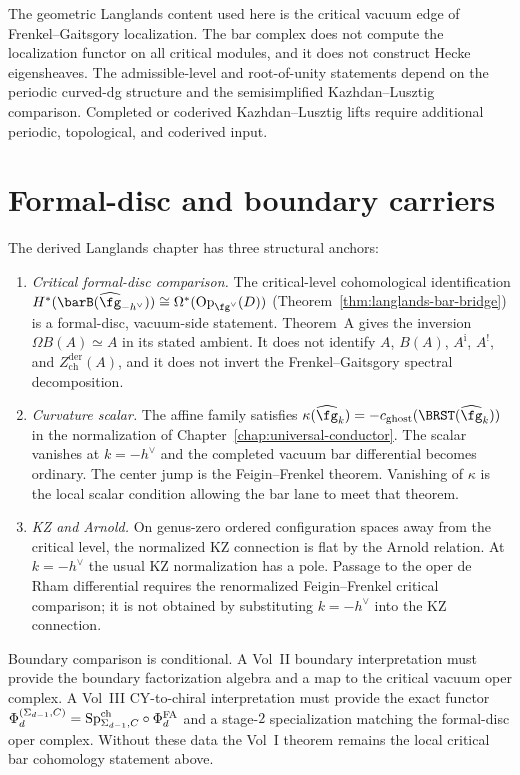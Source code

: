 The geometric Langlands content used here is the critical vacuum edge
of Frenkel--Gaitsgory localization. The bar complex does not compute
the localization functor on all critical modules, and it does not
construct Hecke eigensheaves. The admissible-level and root-of-unity
statements depend on the periodic curved-dg structure and the
semisimplified Kazhdan--Lusztig comparison. Completed or coderived
Kazhdan--Lusztig lifts require additional periodic, topological, and
coderived input.

\section{Formal-disc and boundary carriers}
\label{sec:dl-anchors}

\begin{remark}
\label{rem:dl-anchors}
The derived Langlands chapter has three structural anchors:
\begin{enumerate}[label=\textup{(\Roman*)}]
\item \emph{Critical formal-disc comparison.} The
 critical-level cohomological identification
 $H^*(\barB(\widehat{\fg}_{-h^\vee})) \cong
 \Omega^*(\mathrm{Op}_{\fg^\vee}(D))$
 (Theorem~\ref{thm:langlands-bar-bridge}) is a formal-disc,
 vacuum-side statement. Theorem~A gives the inversion
 $\Omega B(A)\simeq A$ in its stated ambient. It does not identify
 $A$, $B(A)$, $A^{\mathrm i}$, $A^!$, and
 $Z^{\mathrm{der}}_{\mathrm{ch}}(A)$, and it does not invert the
 Frenkel--Gaitsgory spectral decomposition.
\item \emph{Curvature scalar.} The affine family satisfies
 $\kappa(\widehat{\fg}_k) = -c_{\mathrm{ghost}}(\BRST(\widehat{\fg}_k))$
 in the normalization of Chapter~\ref{chap:universal-conductor}.
 The scalar vanishes at $k=-h^\vee$ and the completed vacuum bar
 differential becomes ordinary. The center jump is the
 Feigin--Frenkel theorem. Vanishing of $\kappa$ is the local scalar
 condition allowing the bar lane to meet that theorem.
\item \emph{KZ and Arnold.} On genus-zero ordered configuration
 spaces away from the critical level, the normalized KZ connection is
 flat by the Arnold relation. At $k=-h^\vee$ the usual KZ
 normalization has a pole. Passage to the oper de Rham differential
 requires the renormalized Feigin--Frenkel critical comparison; it is
 not obtained by substituting $k=-h^\vee$ into the KZ connection.
\end{enumerate}
Boundary comparison is conditional. A Vol~II boundary
interpretation must provide the boundary factorization algebra and a
map to the critical vacuum oper complex. A Vol~III CY-to-chiral
interpretation must provide the exact functor
$\Phi_d^{(\Sigma_{d-1},C)}=\mathrm{Sp}^{\mathrm{ch}}_{\Sigma_{d-1},C}\circ\Phi^{\mathrm{FA}}_d$ and a stage-$2$
specialization matching the formal-disc oper complex. Without these
data the Vol~I theorem remains the local critical bar cohomology
statement above.
\end{remark}

